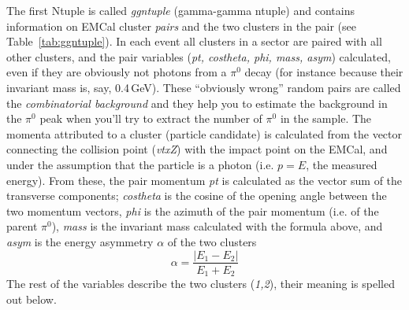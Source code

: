 \documentclass[12pt,letterpaper,aps,prc,superscriptaddress,showpacs,
longbibliography,nofootinbib,floatfix,onecolumn]{revtex4-1}
\newcommand{\piz}{\mbox{$\pi^0$}\xspace}
\newcommand{\gev}{\mbox{GeV}\xspace}
\begin{document}
\vspace{0.05in}
\noindent
The first Ntuple is called {\it ggntuple} (gamma-gamma ntuple) and
contains information on EMCal cluster {\it pairs} and the two clusters
in the pair (see Table~\ref{tab:ggntuple}).  In each event all
clusters in a sector are paired with all other clusters, and the pair
variables ({\it pt, costheta, phi, mass, asym}) calculated, even if
they are obviously not photons from a \piz decay (for instance because
their invariant mass is, say, 0.4\,\gev).  These ``obviously wrong''
random pairs are called the {\it combinatorial background} and they
help you to estimate the background in the \piz peak when you'll try
to extract the number of \piz in the sample.
The momenta attributed to a cluster (particle candidate) is calculated
from the vector connecting the collision point ({\it vtxZ}) with the
impact point on the EMCal, and under the assumption that the particle
is a photon (i.e. $p=E$, the measured energy).  From these, the pair
momentum {\it pt} is calculated as the vector sum of the transverse
components; {\it costheta} is the cosine of the opening angle between
the two momentum vectors, {\it phi} is the azimuth of the pair
momentum (i.e. of the parent \piz), {\it mass} is the invariant mass
calculated with the formula above, and {\it asym} is the energy
asymmetry $\alpha$ of the two clusters
$$\alpha = \frac{|E_1-E_2|}{E_1+E_2}$$
The rest of the variables describe the two clusters ({\it 1,2}), their
meaning is spelled out below.
\end{document}
